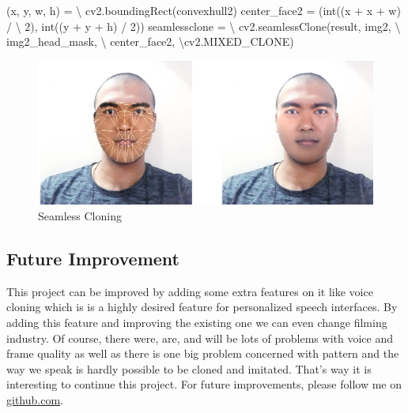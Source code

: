 \documentclass[12pt, a4paper, twocolumn]{article}
\newenvironment{Shaded}{}{}
\newcommand{\DecValTok}[1]{\textcolor[rgb]{0.25,0.63,0.44}{#1}}
\newcommand{\OperatorTok}[1]{\textcolor[rgb]{0.40,0.40,0.40}{#1}}
\newcommand{\BuiltInTok}[1]{#1}
\newcommand{\NormalTok}[1]{#1}
\begin{document}
\begin{Shaded}
	\small
	\begin{Highlighting}[]
\NormalTok{(x, y, w, h) }\OperatorTok{= }\OperatorTok{\textbackslash{}}
\NormalTok{  cv2.boundingRect(convexhull2)}
\NormalTok{center_face2 }\OperatorTok{=}\NormalTok{ (}\BuiltInTok{int}\NormalTok{((x }\OperatorTok{+}\NormalTok{ x }\OperatorTok{+}\NormalTok{ w) }\OperatorTok{/ }\OperatorTok{\textbackslash{}}
\NormalTok{ } \DecValTok{2}\NormalTok{), }\BuiltInTok{int}\NormalTok{((y }\OperatorTok{+}\NormalTok{ y }\OperatorTok{+}\NormalTok{ h) }\OperatorTok{/} \DecValTok{2}\NormalTok{))}
\NormalTok{seamlessclone }\OperatorTok{= }\OperatorTok{\textbackslash{}}
\NormalTok{ }\NormalTok{cv2.seamlessClone(result, img2,  }\OperatorTok{\textbackslash{}}
\NormalTok{img2_head_mask, }\OperatorTok{\textbackslash{}}
\NormalTok{center_face2, }\OperatorTok{\textbackslash{}}\NormalTok{cv2.MIXED_CLONE)}
	\end{Highlighting}
\end{Shaded}

\begin{figure}
	\centering
	\includegraphics{meta/output_38_0.png}
	\caption{Seamless Cloning}
\end{figure}

\subsection{Future Improvement}\label{header-n357}

This project can be improved by adding some extra features on it like
voice cloning which is is a highly desired feature for personalized
speech interfaces. By adding this feature and improving the existing one
we can even change filming industry. Of course, there were, are, and
will be lots of problems with voice and frame quality as well as there
is one big problem concerned with pattern and the way we speak is hardly
possible to be cloned and imitated. That's way it is interesting to
continue this project. For future improvements, please follow me on
\href{https://github.com/KhasanovR/}{github.com}.
\end{document}
